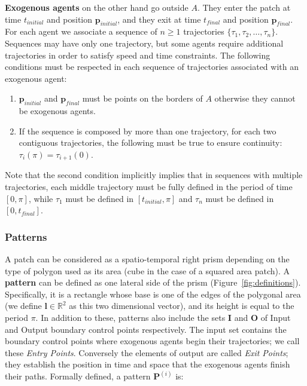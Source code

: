 {\bf Exogenous agents} on the other hand go outside $A$.
They enter the patch at time $t_{initial}$ and position $\mathbf{p}_{initial}$, and they exit at time $t_{final}$ and position $\mathbf{p}_{final}$.
For each agent we associate a sequence of $n \ge 1$ trajectories $\{ \tau_1, \tau_2, \dots, \tau_n\}$.
Sequences may have only one trajectory, but some agents require additional trajectories in order to satisfy speed and time constraints.
The following conditions must be respected in each sequence of trajectories associated with an exogenous agent:

\begin{enumerate}
	\item $\mathbf{p}_{initial}$ and $\mathbf{p}_{final}$ must be points on the borders of $A$ otherwise they cannot be exogenous agents.
	\item If the sequence is composed by more than one trajectory, for each two contiguous trajectories, the following must be true to ensure continuity: $\tau_i(\pi) = \tau_{i+1}(0)$.

\end{enumerate}

Note that the second condition implicitly implies that in sequences with multiple trajectories, each middle trajectory must be fully defined in the period of time $[0,\pi]$, while $\tau_1$ must be defined in $[t_{initial},\pi]$ and $\tau_n$ must be defined in $[0, t_{final}]$.


\subsubsection{Patterns}

% 
A patch can be considered as a spatio-temporal right prism depending on the type of polygon used as its area (cube in the case of a squared area patch).
A \textbf{pattern} can be defined as one lateral side of the prism (Figure~\ref{fig:definitions}).
Specifically, it is a rectangle whose base is one of the edges of the polygonal area (we define $\mathbf{l} \in \mathbb{R}^2$ as this two dimensional vector), and its height is equal to the period $\pi$.
In addition to these, patterns also include the sets $\mathbf{I}$ and $\mathbf{O}$ of Input and Output boundary control points respectively.
The input set contains the boundary control points where exogenous agents begin their trajectories; we call these \emph{Entry Points}.
Conversely the elements of output are called \emph{Exit Points}; they establish the position in time and space that the exogenous agents finish their paths.
Formally defined, a pattern $\mathbf{P}^{(i)}$ is:

